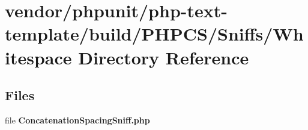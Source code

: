 \section{vendor/phpunit/php-\/text-\/template/build/\+P\+H\+P\+C\+S/\+Sniffs/\+Whitespace Directory Reference}
\label{dir_74a6d29a0987270abd2af2527dbc56c4}
\subsection*{Files}
\begin{DoxyCompactItemize}
\item 
file {\bf Concatenation\+Spacing\+Sniff.\+php}
\end{DoxyCompactItemize}
